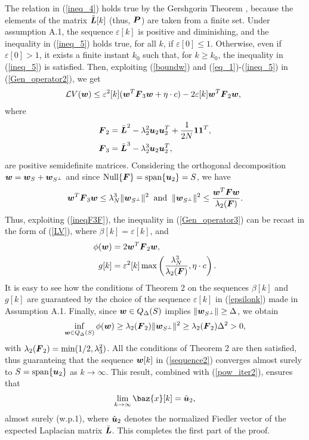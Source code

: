 \documentclass[10pt,twocolumn]{IEEEtran}
\def\bF{\mbox{\boldmath $F$}}
\def\bL{\mbox{\boldmath $L$}}
\def\bP{\mbox{\boldmath $P$}}
\def\bu{\mbox{\boldmath $u$}}
\def\bw{\mbox{\boldmath $w$}}
\def\bx{\baz{x}}
\begin{document}
The relation in (\ref{ineq_4}) holds true by the Gershgorin Theorem \cite{Horn-Johnson}, because the elements of the matrix $\tilde{\bL}[k]$ (thus, $\bP$) are taken from a finite set. Under assumption A.1, the sequence $\varepsilon[k]$ is positive and diminishing, and the inequality in (\ref{ineq_5}) holds true, for all $k$, if $\varepsilon[0]\leq1$. Otherwise, even if $\varepsilon[0]>1$, it exists a finite instant $k_0$ such that, for $k\geq k_0$, the inequality in (\ref{ineq_5}) is satisfied. Then, exploiting (\ref{boundw}) and (\ref{eq_1})-(\ref{ineq_5}) in (\ref{Gen_operator2}), we get
\begin{align}\label{Gen_operator3}
\hspace{-.15cm}\mathcal{L}V(\bw)\leq \varepsilon^2[k](\bw^T\bF_3\bw+\eta\cdot c)-2\varepsilon[k] \bw^T\bF_2\bw,
\end{align}
where
\begin{align}\label{F23}
\bF_2&=\bar{\bL}^2-\lambda^2_2\bu_2\bu^T_2+\frac{1}{2N}\mathbf{11}^T, \\
\bF_3&=\bar{\bL}^3-\lambda^3_2\bu_2\bu^T_2,
\end{align}
are positive semidefinite matrices. Considering the orthogonal decomposition $\bw=\bw_{S}+\bw_{S^\perp}$ and since ${\rm Null}\{\bF\}={\rm span}\{\bu_2\}=S$, we have
\begin{align}\label{ineqF3F}
\bw^T\bF_3\bw\leq \lambda^3_N\|\bw_{S^\perp}\|^2 \;\; \hbox{and} \;\;  \|\bw_{S^\perp}\|^2\leq\frac{\bw^T\bF\bw}{\lambda_2(\bF)}.
\end{align}
Thus, exploiting (\ref{ineqF3F}), the inequality in (\ref{Gen_operator3}) can be recast in the form of (\ref{LV}), where $\beta[k]=\varepsilon[k]$, and
\begin{align}
\phi(\bw)&=2\bw^T\bF_2\bw,\\
g[k]&=\varepsilon^2[k]\max\left(\frac{\lambda^3_N}{\lambda_2(\bF)},\eta\cdot c\right).
\end{align}
It is easy to see how the conditions of Theorem 2 on the sequences $\beta[k]$ and $g[k]$ are guaranteed by the choice of the sequence $\varepsilon[k]$ in (\ref{epsilonk}) made in Assumption A.1. Finally, since
$\bw\in Q_\Delta(S)$ implies $\|\bw_{S^\perp}\|\geq\Delta$, we obtain
\begin{align}
 \inf_{\boldsymbol{w}\in Q_\Delta(S)} \phi(\bw)\geq \lambda_2(\bF_2)\|\bw_{S^\perp}\|^2\geq \lambda_2(\bF_2)\Delta^2>0, \nonumber
\end{align}
with $\lambda_2(\bF_2)=\min(1/2,\lambda_3^2)$. All the conditions of Theorem 2 are then satisfied, thus guaranteing that the sequence $\bw[k]$ in (\ref{sequence2}) converges almost surely to $S={\rm span}\{\bu_2\}$ as $k\rightarrow\infty$. This result, combined with (\ref{pow_iter2}), ensures that
\begin{align}
\lim_{k\rightarrow\infty} \bx[k]=\hat{\bu}_{2},
\end{align}
almost surely (w.p.1), where $\hat{\bu}_{2}$ denotes the normalized Fiedler vector of the expected Laplacian matrix $\bar{\bL}$.
This completes the first part of the proof.
\end{document}
